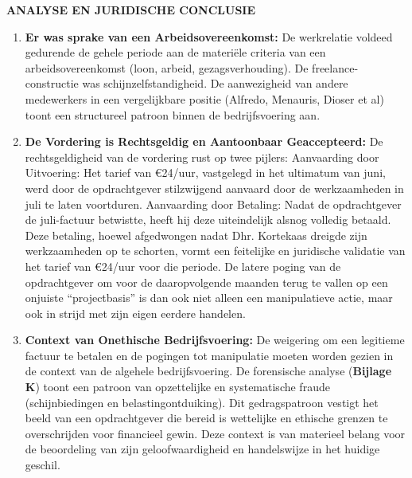 \documentclass[10pt,a4paper]{article}
\begin{document}
\begin{adjustwidth}{15mm}{15mm}
\vspace{1em}

{\fontsize{11}{16}\selectfont\textbf{ANALYSE EN JURIDISCHE CONCLUSIE}}

\begin{enumerate}
\item \textbf{Er was sprake van een Arbeidsovereenkomst:} De werkrelatie voldeed gedurende de gehele periode aan de materiële criteria van een arbeidsovereenkomst (loon, arbeid, gezagsverhouding). De freelance-constructie was schijnzelfstandigheid. De aanwezigheid van andere medewerkers in een vergelijkbare positie (Alfredo, Menauris, Dioser et al) toont een structureel patroon binnen de bedrijfsvoering aan.

\item \textbf{De Vordering is Rechtsgeldig en Aantoonbaar Geaccepteerd:}
De rechtsgeldigheid van de vordering rust op twee pijlers:
Aanvaarding door Uitvoering: Het tarief van €24/uur, vastgelegd in het ultimatum van juni, werd door de opdrachtgever stilzwijgend aanvaard door de werkzaamheden in juli te laten voortduren.
Aanvaarding door Betaling: Nadat de opdrachtgever de juli-factuur betwistte, heeft hij deze uiteindelijk alsnog volledig betaald. Deze betaling, hoewel afgedwongen nadat Dhr. Kortekaas dreigde zijn werkzaamheden op te schorten, vormt een feitelijke en juridische validatie van het tarief van €24/uur voor die periode.
De latere poging van de opdrachtgever om voor de daaropvolgende maanden terug te vallen op een onjuiste ``projectbasis'' is dan ook niet alleen een manipulatieve actie, maar ook in strijd met zijn eigen eerdere handelen.

\item \textbf{Context van Onethische Bedrijfsvoering:} De weigering om een legitieme factuur te betalen en de pogingen tot manipulatie moeten worden gezien in de context van de algehele bedrijfsvoering. De forensische analyse (\textbf{Bijlage K}) toont een patroon van opzettelijke en systematische fraude (schijnbiedingen en belastingontduiking). Dit gedragspatroon vestigt het beeld van een opdrachtgever die bereid is wettelijke en ethische grenzen te overschrijden voor financieel gewin. Deze context is van materieel belang voor de beoordeling van zijn geloofwaardigheid en handelswijze in het huidige geschil.
\end{enumerate}

\end{adjustwidth}
\end{document}
